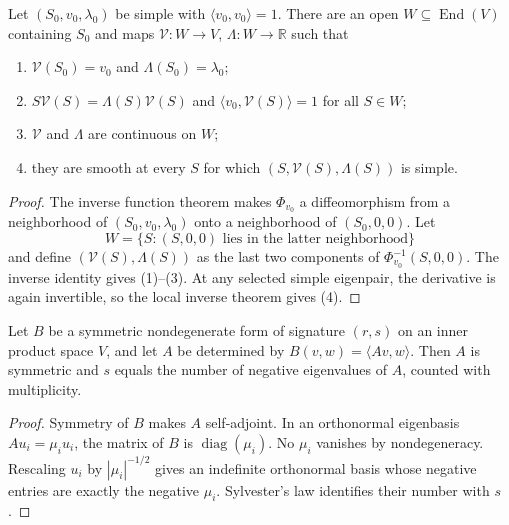 \begin{proposition}
\label{prop:smooth-eigen-selection}
\leanok
{}
Let $(S_0,v_0,\lambda_0)$ be simple with $\langle v_0,v_0\rangle=1$. There are
an open $W\subseteq\operatorname{End}(V)$ containing $S_0$ and maps
$\mathcal V\colon W\to V$, $\Lambda\colon W\to\mathbb R$ such that
\begin{enumerate}
\item $\mathcal V(S_0)=v_0$ and $\Lambda(S_0)=\lambda_0$;
\item $S\mathcal V(S)=\Lambda(S)\mathcal V(S)$ and
$\langle v_0,\mathcal V(S)\rangle=1$ for all $S\in W$;
\item $\mathcal V$ and $\Lambda$ are continuous on $W$;
\item they are smooth at every $S$ for which
$(S,\mathcal V(S),\Lambda(S))$ is simple.
\end{enumerate}
\end{proposition}

\begin{proof}
\leanok
{}
\sketch The inverse function theorem makes $\Phi_{v_0}$ a diffeomorphism from a
neighborhood of $(S_0,v_0,\lambda_0)$ onto a neighborhood of $(S_0,0,0)$. Let
\[
W=\{S:(S,0,0)\text{ lies in the latter neighborhood}\}
\]
and define $(\mathcal V(S),\Lambda(S))$ as the last two components of
$\Phi_{v_0}^{-1}(S,0,0)$. The inverse identity gives (1)--(3). At any selected
simple eigenpair, the derivative is again invertible, so the local inverse theorem
gives (4).
\end{proof}

\begin{lemma}
\label{lem:signature-and-eigenvalue-signs}
\leanok
{}
Let $B$ be a symmetric nondegenerate form of signature $(r,s)$ on an inner product
space $V$, and let $A$ be determined by
$B(v,w)=\langle Av,w\rangle$. Then $A$ is symmetric and $s$ equals the number of
negative eigenvalues of $A$, counted with multiplicity.
\end{lemma}

\begin{proof}
\leanok
{}
\sketch Symmetry of $B$ makes $A$ self-adjoint. In an orthonormal eigenbasis
$Au_i=\mu_i u_i$, the matrix of $B$ is $\operatorname{diag}(\mu_i)$. No $\mu_i$
vanishes by nondegeneracy. Rescaling $u_i$ by $|\mu_i|^{-1/2}$ gives an
indefinite orthonormal basis whose negative entries are exactly the negative
$\mu_i$. Sylvester's law identifies their number with $s$.
\end{proof}

